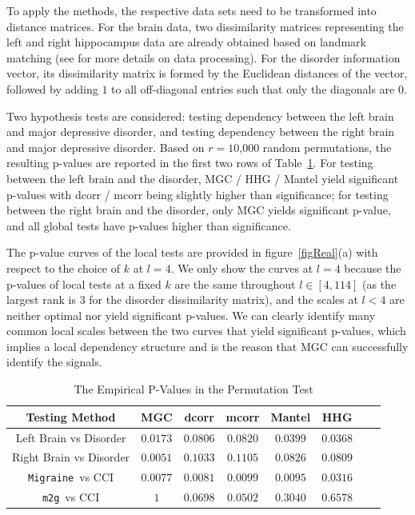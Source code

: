\documentclass[11pt]{article}
\providecommand{\sct}[1]{{\sc \texttt{#1}}}
\newcommand{\Migraine}{\sct{Migraine}}
\newcommand{\mtg}{\sct{m2g}}
\begin{document}
To apply the methods, the respective data sets need to be transformed into distance matrices. For the brain data, two dissimilarity matrices representing the left and right hippocampus data are already obtained based on landmark matching (see \cite{ParkEtAl2011} for more details on data processing). For the disorder information vector,
its dissimilarity matrix is formed by the Euclidean distances of the vector, followed by adding $1$ to all off-diagonal entries such that only the diagonals are $0$.

Two hypothesis tests are considered: testing dependency between the left brain and major depressive disorder, and testing dependency between the right brain and major depressive disorder. Based on $r=10$,$000$ random permutations, the resulting p-values are reported in the first two rows of Table~\ref{table1}. For testing between the left brain and the disorder, MGC / HHG / Mantel yield significant p-values with dcorr / mcorr being slightly higher than significance; for testing between the right brain and the disorder, only MGC yields significant p-value, and all global tests have p-values higher than significance. 

The p-value curves of the local tests are provided in figure~\ref{figReal}(a) with respect to the choice of $k$ at $l=4$. We only show the curves at $l=4$ because the p-values of local tests at a fixed $k$ are the same throughout $l \in [4,114]$ (as the largest rank is $3$ for the disorder dissimilarity matrix), and the scales at $l<4$ are neither optimal nor yield significant p-values. We can clearly identify many common local scales between the two curves that yield significant p-values, which implies a local dependency structure and is the reason that MGC can successfully identify the signals. %


\begin{table}[!t]
\footnotesize
\renewcommand{\arraystretch}{0.5}
\centering
{\begin{tabular}{|c||c|c|c|c|c|c|c|}
\hline
Testing Method & MGC & dcorr & mcorr & Mantel & HHG \\
\hline
Left Brain vs Disorder  & $0.0173$ & $0.0806$ & $0.0820$ & $0.0399$ & $0.0368$ \\
\hline
Right Brain vs Disorder & $0.0051$ & $0.1033$ & $0.1105$  & $0.0826$ & $0.0809$\\
\hline
\Migraine~vs CCI & $0.0077$ & $0.0081$ & $0.0099$  & $0.0095$ & $0.0316$\\
\hline
\mtg~vs CCI & $1$ & $0.0698$ & $0.0502$  & $0.3040$ & $0.6578$\\
\hline
\end{tabular}
\caption{The Empirical P-Values in the Permutation Test}
\label{table1}
}
\end{table}
\end{document}
